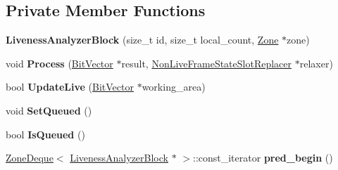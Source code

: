 \subsection*{Private Member Functions}
\begin{DoxyCompactItemize}
\item 
{\bfseries Liveness\+Analyzer\+Block} (size\+\_\+t id, size\+\_\+t local\+\_\+count, \hyperlink{classv8_1_1internal_1_1_zone}{Zone} $\ast$zone)\hypertarget{classv8_1_1internal_1_1compiler_1_1_liveness_analyzer_block_a9f16dcbd90d7e96d61a745fc3954358c}{}\label{classv8_1_1internal_1_1compiler_1_1_liveness_analyzer_block_a9f16dcbd90d7e96d61a745fc3954358c}

\item 
void {\bfseries Process} (\hyperlink{classv8_1_1internal_1_1_bit_vector}{Bit\+Vector} $\ast$result, \hyperlink{classv8_1_1internal_1_1compiler_1_1_non_live_frame_state_slot_replacer}{Non\+Live\+Frame\+State\+Slot\+Replacer} $\ast$relaxer)\hypertarget{classv8_1_1internal_1_1compiler_1_1_liveness_analyzer_block_adf463b82ae32ea02f82ce62d38926c1d}{}\label{classv8_1_1internal_1_1compiler_1_1_liveness_analyzer_block_adf463b82ae32ea02f82ce62d38926c1d}

\item 
bool {\bfseries Update\+Live} (\hyperlink{classv8_1_1internal_1_1_bit_vector}{Bit\+Vector} $\ast$working\+\_\+area)\hypertarget{classv8_1_1internal_1_1compiler_1_1_liveness_analyzer_block_a655dc147814b18cd89f0345d1770f6cc}{}\label{classv8_1_1internal_1_1compiler_1_1_liveness_analyzer_block_a655dc147814b18cd89f0345d1770f6cc}

\item 
void {\bfseries Set\+Queued} ()\hypertarget{classv8_1_1internal_1_1compiler_1_1_liveness_analyzer_block_ae9313e7b866f48f18edcb939e11daf81}{}\label{classv8_1_1internal_1_1compiler_1_1_liveness_analyzer_block_ae9313e7b866f48f18edcb939e11daf81}

\item 
bool {\bfseries Is\+Queued} ()\hypertarget{classv8_1_1internal_1_1compiler_1_1_liveness_analyzer_block_a3270d763081d08e93e19d9b641934f20}{}\label{classv8_1_1internal_1_1compiler_1_1_liveness_analyzer_block_a3270d763081d08e93e19d9b641934f20}

\item 
\hyperlink{classv8_1_1internal_1_1_zone_deque}{Zone\+Deque}$<$ \hyperlink{classv8_1_1internal_1_1compiler_1_1_liveness_analyzer_block}{Liveness\+Analyzer\+Block} $\ast$ $>$\+::const\+\_\+iterator {\bfseries pred\+\_\+begin} ()\hypertarget{classv8_1_1internal_1_1compiler_1_1_liveness_analyzer_block_a6f6e11a74dd249297fb36c58946d6a42}{}\label{classv8_1_1internal_1_1compiler_1_1_liveness_analyzer_block_a6f6e11a74dd249297fb36c58946d6a42}


\end{DoxyCompactItemize}
